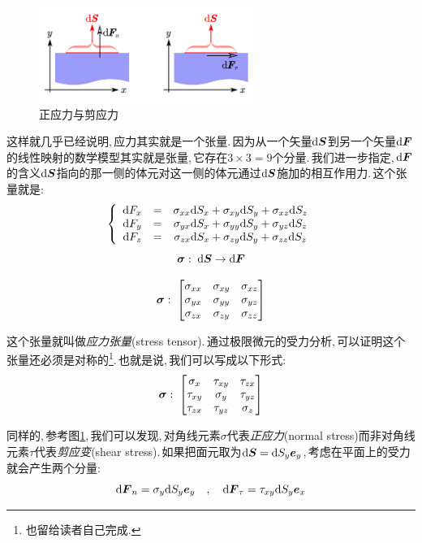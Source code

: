 \begin{figure}
\vspace{-0.5cm}
\centering
\includegraphics[width=7cm]{image/6-7-2.png}
\caption{正应力与剪应力}\label{6-7-2}
\end{figure}
这样就几乎已经说明,\,应力其实就是一个张量.\,因为从一个矢量$\textrm{d} \boldsymbol{S}$到另一个矢量$\textrm{d} \boldsymbol{F}$的线性映射的数学模型其实就是张量,\,它存在$3\times 3=9$个分量.\,我们进一步指定,\,$\textrm{d} \boldsymbol{F}$的含义$\textrm{d} \boldsymbol{S}$指向的那一侧的体元对这一侧的体元通过$\textrm{d} \boldsymbol{S}$施加的相互作用力.\,这个张量就是:
\[\left\{\begin{array}{ccc}\textrm{d} F_x &= & \sigma_{xx} \textrm{d} S_x + \sigma_{xy} \textrm{d} S_y+\sigma_{xz} \textrm{d} S_z \\ \textrm{d} F_y&= & \sigma_{yx} \textrm{d} S_x + \sigma_{yy} \textrm{d} S_y+\sigma_{yz} \textrm{d} S_z \\ \textrm{d} F_z &= & \sigma_{zx} \textrm{d} S_x + \sigma_{zy} \textrm{d} S_y+\sigma_{zz} \textrm{d} S_z \end{array}\right.\]
\[\boldsymbol{\sigma}:\; \textrm{d} \boldsymbol{S}\rightarrow \textrm{d} \boldsymbol{F}\]

\[\boldsymbol{\sigma}:\; \begin{bmatrix}\sigma_{xx}&\sigma_{xy}&\sigma_{xz}\\\sigma_{yx}&\sigma_{yy}&\sigma_{yz}\\\sigma_{zx}&\sigma_{zy}&\sigma_{zz}\end{bmatrix}\]

这个张量就叫做\emph{应力张量}(stress tensor).\,通过极限微元的受力分析,\,可以证明这个张量还必须是对称的\footnote{也留给读者自己完成.}.\,也就是说,\,我们可以写成以下形式:
\[\boldsymbol{\sigma}:\; \begin{bmatrix}\sigma_{x}&\tau_{xy}&\tau_{zx}\\\tau_{xy}&\sigma_{y}&\tau_{yz}\\\tau_{zx}&\tau_{yz}&\sigma_{z}\end{bmatrix}\]

同样的,\,参考图\ref{6-7-2},\,我们可以发现,\,对角线元素$\sigma$代表\emph{正应力}(normal stress)而非对角线元素$\tau$代表\emph{剪应变}(shear stress).\,如果把面元取为$\textrm{d}\boldsymbol{S}=\textrm{d} S_y\boldsymbol{e}_y$,\,考虑在平面上的受力就会产生两个分量:
\[\textrm{d} \boldsymbol{F}_n=\sigma_y \textrm{d} S_y\boldsymbol{e}_y\quad,\quad\textrm{d} \boldsymbol{F}_{\tau}=\tau_{xy} \textrm{d} S_y\boldsymbol{e}_x\]

